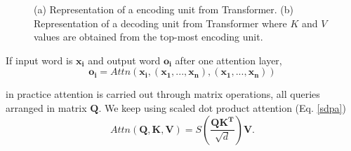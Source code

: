 \documentclass[11pt,english,listoffigures,listoftables]{tfgetsinf}
\newcommand{\vect}[1]{\mathbf{#1}}
\begin{document}
\begin{figure}%
    \centering
    \qquad
    \caption{(a) Representation of a encoding unit from Transformer. (b) Representation of a decoding unit from Transformer where $K$ and $V$ values are obtained from the top-most encoding unit. }%
    \label{chap1:encode}%
\end{figure}

If input word is $\vect{x_i}$ and output word $\vect{o_i}$ after one attention layer, 
\begin{equation}
    \vect{o_i} = Attn(\vect{x_i}, (\vect{x_1}, ...,\vect{x_n}), (\vect{x_1}, ...,\vect{x_n}))
\end{equation}

in practice attention is carried out through matrix operations, all queries arranged in matrix $\vect{Q}$.
We keep using scaled dot product attention (Eq. \ref{sdpa})
\begin{equation}
    Attn(\vect{Q}, \vect{K}, \vect{V}) = S(\frac{\vect{QK^T}}{\sqrt{d}})\vect{V}.
\end{equation}
\end{document}
